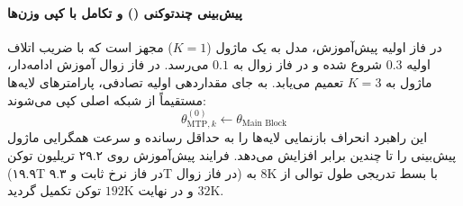 \paragraph*{پیش‌بینی چندتوکنی () و تکامل با کپی وزن‌ها}
در فاز اولیه پیش‌آموزش، مدل به یک ماژول  ($K=1$) مجهز است که با ضریب اتلاف اولیه $0.3$ شروع شده و در فاز زوال به $0.1$ می‌رسد. در فاز زوال آموزش ادامه‌دار، ماژول  به $K=3$ تعمیم می‌یابد. به جای مقداردهی اولیه تصادفی، پارامترهای لایه‌ها مستقیماً از شبکه اصلی کپی می‌شوند:
\begin{equation}
    \theta_{\text{MTP}, k}^{(0)} \leftarrow \theta_{\text{Main Block}}
\end{equation}
این راهبرد انحراف بازنمایی لایه‌ها را به حداقل رسانده و سرعت همگرایی ماژول پیش‌بینی را تا چندین برابر افزایش می‌دهد. فرایند پیش‌آموزش روی ۲۹.۲ تریلیون توکن (۱۹.۹T در فاز نرخ ثابت و ۹.۳T در فاز زوال) با بسط تدریجی طول توالی از $8\text{K}$ به $32\text{K}$ و در نهایت $192\text{K}$ توکن تکمیل گردید.